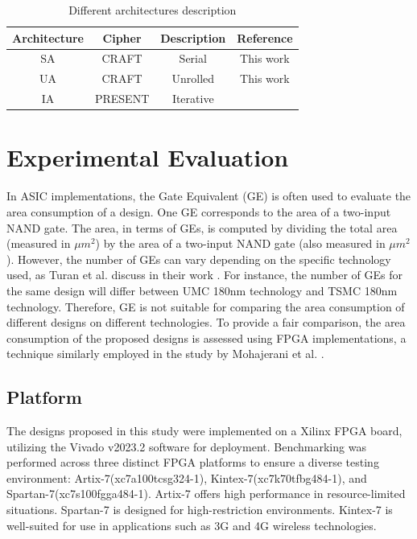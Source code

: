 \documentclass[final,5p,times,twocolumn]{elsarticle}
\begin{document}
\begin{table}[h]
    \centering
    \caption{Different architectures description}\label{tab2}%
    \begin{tabular}{|c|c|c|c|}
        \hline
        Architecture & Cipher  & Description & Reference           \\
        \hline
        SA           & CRAFT   & Serial      & This work           \\
        UA           & CRAFT   & Unrolled    & This work           \\
        IA           & PRESENT & Iterative   & \cite{Bharathi2022} \\
        \hline
    \end{tabular}
\end{table}


\section{Experimental Evaluation}\label{sec4}

In ASIC implementations, the Gate Equivalent (GE) is often used to evaluate the area consumption of a design.
One GE corresponds to the area of a two-input NAND gate. The area, in terms of GEs, is computed by dividing the total area (measured in $\mu m^2$) by the area of a two-input NAND gate (also measured in $\mu m^2$).
However, the number of GEs can vary depending on the specific technology used, as Turan et al. discuss in their work \cite{Turan}.
For instance, the number of GEs for the same design will differ between UMC 180nm technology and TSMC 180nm technology.
Therefore, GE is not suitable for comparing the area consumption of different designs on different technologies.
To provide a fair comparison, the area consumption of the proposed designs is assessed using FPGA implementations, a technique similarly employed in the study by Mohajerani et al. \cite{Mohajerani2020}.

\subsection{Platform}\label{subsec4}

The designs proposed in this study were implemented on a Xilinx FPGA board, utilizing the Vivado v2023.2 software for deployment.
Benchmarking was performed across three distinct FPGA platforms to ensure a diverse testing environment: Artix-7(xc7a100tcsg324-1), Kintex-7(xc7k70tfbg484-1), and Spartan-7(xc7s100fgga484-1).
Artix-7 offers high performance in resource-limited situations. Spartan-7 is designed for high-restriction environments. Kintex-7 is well-suited for use in applications such as 3G and 4G wireless technologies.
\end{document}
